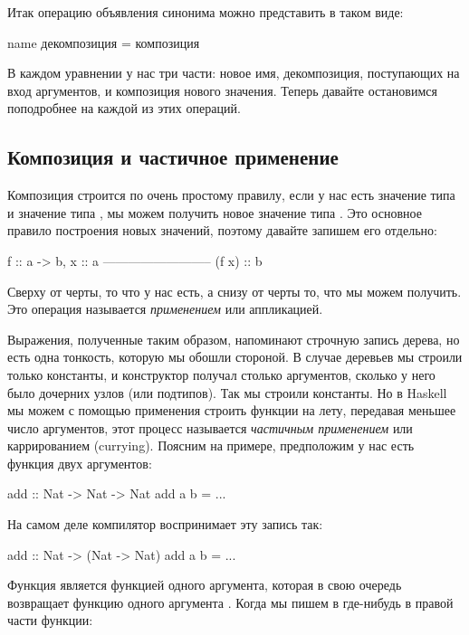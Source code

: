 Итак операцию объявления синонима можно представить в таком виде:


\begin{code}
name    декомпозиция    =  композиция 
\end{code}

В каждом уравнении у нас три части: новое имя, декомпозиция, поступающих
на вход аргументов, и композиция нового значения. Теперь давайте
остановимся поподробнее на каждой из этих операций.

\subsection{Композиция и частичное применение}

Композиция строится по очень простому правилу, если у нас есть значение
 типа  и значение  типа , мы можем получить
новое значение  типа . Это основное правило построения
новых значений, поэтому давайте запишем его отдельно:


\begin{code}
                    f :: a -> b,       x :: a
                    --------------------------
                            (f x) :: b
\end{code}

Сверху от черты, то что у нас есть, а снизу от черты то, что мы можем
получить. Это операция называется \emph{применением} или аппликацией.

Выражения, полученные таким образом, напоминают строчную запись дерева,
но есть одна тонкость, которую мы обошли стороной. В случае деревьев мы
строили только константы, и конструктор получал столько аргументов,
сколько у него было дочерних узлов (или подтипов). Так мы строили
константы. Но в Haskell мы можем с помощью применения строить функции на
лету, передавая меньшее число аргументов, этот процесс называется
\emph{частичным применением} или каррированием (currying). Поясним на
примере, предположим у нас есть функция двух аргументов:


\begin{code}
add :: Nat -> Nat -> Nat
add a b = ...
\end{code}

На самом деле компилятор воспринимает эту запись так:


\begin{code}
add :: Nat -> (Nat -> Nat)
add a b = ...
\end{code}

Функция  является функцией одного аргумента, которая в свою
очередь возвращает функцию одного аргумента . Когда мы
пишем в где-нибудь в правой части функции:


